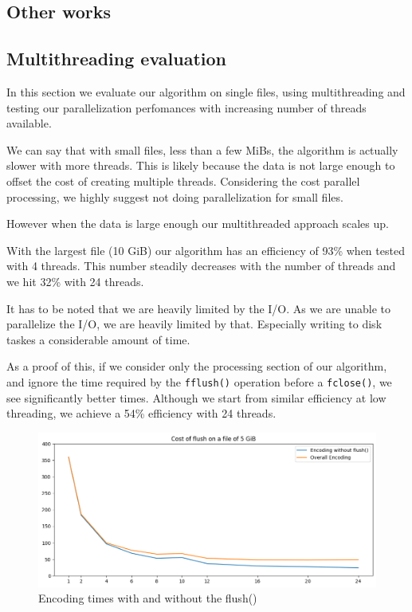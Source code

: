 \subsection{Other works}

\subsection{Multithreading evaluation}
In this section we evaluate our algorithm on single files, using multithreading and testing our parallelization perfomances with increasing number of threads available.

We can say that with small files, less than a few MiBs, the algorithm is actually slower with more threads. 
This is likely because the data is not large enough to offset the cost of creating multiple threads. Considering the cost parallel processing, we highly suggest not doing parallelization for small files.

However when the data is large enough our multithreaded approach scales up.

With the largest file (10 GiB) our algorithm has an efficiency of 93\% when tested with 4 threads. This number steadily decreases with the number of threads and we hit 32\% with 24 threads.

It has to be noted that we are heavily limited by the I/O. As we are unable to parallelize the I/O, we are heavily limited by that. Especially writing to disk taskes a considerable amount of time.

As a proof of this, if we consider only the processing section of our algorithm, and ignore the time required by the \verb|fflush()| operation before a \verb|fclose()|, we see significantly better times. Although we start from similar efficiency at low threading, we achieve a 54\% efficiency with 24 threads.

\begin{figure}
	\centering
	\includegraphics[width=0.8\linewidth]{"../imgs/Flush vs non Flush"}
	\caption{Encoding times with and without the flush()}
	\label{fig:flush-vs-non-flush}
\end{figure}

